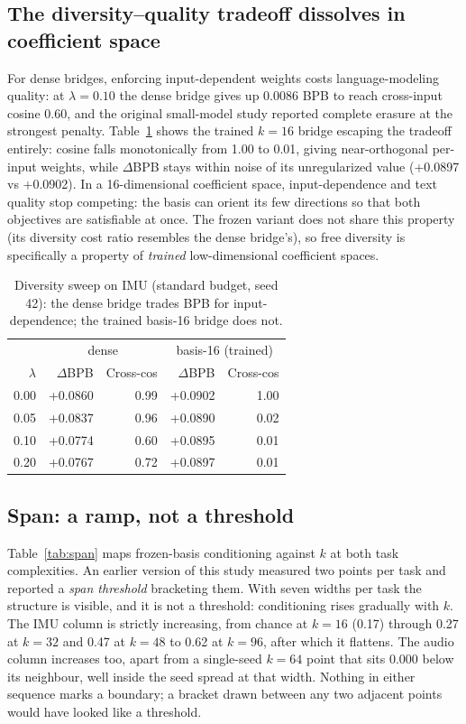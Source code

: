 \documentclass[11pt]{article}
\begin{document}
\subsection{The diversity--quality tradeoff dissolves in coefficient space}
For dense bridges, enforcing input-dependent weights costs language-modeling quality: at $\lambda = 0.10$ the dense bridge gives up 0.0086 BPB to reach cross-input cosine 0.60, and the original small-model study reported complete erasure at the strongest penalty. Table~\ref{tab:lambda} shows the trained $k{=}16$ bridge escaping the tradeoff entirely: cosine falls monotonically from 1.00 to 0.01, giving near-orthogonal per-input weights, while $\Delta$BPB stays within noise of its unregularized value (+0.0897 vs +0.0902). In a 16-dimensional coefficient space, input-dependence and text quality stop competing: the basis can orient its few directions so that both objectives are satisfiable at once. The frozen variant does not share this property (its diversity cost ratio resembles the dense bridge's), so free diversity is specifically a property of \emph{trained} low-dimensional coefficient spaces.

\begin{table}[t]
\centering
\caption{Diversity sweep on IMU (standard budget, seed 42): the dense bridge trades BPB for input-dependence; the trained basis-16 bridge does not.}
\label{tab:lambda}
\begin{tabular}{rrrrr}
\toprule
 & \multicolumn{2}{c}{dense} & \multicolumn{2}{c}{basis-16 (trained)} \\
$\lambda$ & $\Delta$BPB & Cross-cos & $\Delta$BPB & Cross-cos \\
\midrule
0.00 & +0.0860 & 0.99 & +0.0902 & 1.00 \\
0.05 & +0.0837 & 0.96 & +0.0890 & 0.02 \\
0.10 & +0.0774 & 0.60 & +0.0895 & 0.01 \\
0.20 & +0.0767 & 0.72 & +0.0897 & 0.01 \\
\bottomrule
\end{tabular}
\end{table}

\subsection{Span: a ramp, not a threshold}
\label{sec:span}
Table~\ref{tab:span} maps frozen-basis conditioning against $k$ at both task complexities. An earlier version of this study measured two points per task and reported a \emph{span threshold} bracketing them. With seven widths per task the structure is visible, and it is not a threshold: conditioning rises gradually with $k$. The IMU column is strictly increasing, from chance at $k{=}16$ (0.17) through 0.27 at $k{=}32$ and 0.47 at $k{=}48$ to 0.62 at $k{=}96$, after which it flattens. The audio column increases too, apart from a single-seed $k{=}64$ point that sits 0.000 below its neighbour, well inside the seed spread at that width. Nothing in either sequence marks a boundary; a bracket drawn between any two adjacent points would have looked like a threshold.
\end{document}
